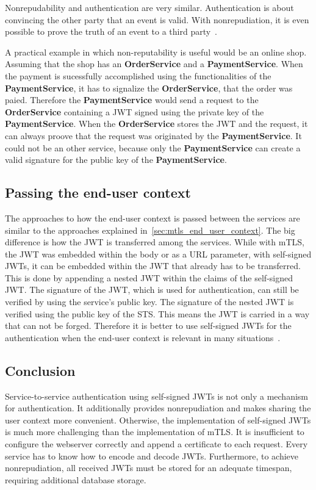 Nonrepudability and authentication are very similar.
Authentication is about convincing the other party that an event is valid.
With nonrepudiation, it is even possible to prove the truth of an event to a third party~\cite{wu20131200}.

A practical example in which non-reputability is useful would be an online shop.
Assuming that the shop has an \textbf{OrderService} and a \textbf{PaymentService}.
When the payment is sucessfully accomplished using the functionalities of the \textbf{PaymentService}, it has to signalize the \textbf{OrderService}, that the order was paied.
Therefore the \textbf{PaymentService} would send a request to the \textbf{OrderService} containing a JWT signed using the private key of the \textbf{PaymentService}.
When the \textbf{OrderService} stores the JWT and the request, it can always proove that the request was originated by the \textbf{PaymentService}.
It could not be an other service, because only the \textbf{PaymentService} can create a valid signature for the public key of the \textbf{PaymentService}.


\subsection{Passing the end-user context}
The approaches to how the end-user context is passed between the services are similar to the approaches explained in~\ref{sec:mtls_end_user_context}.
The big difference is how the JWT is transferred among the services.
While with mTLS, the JWT was embedded within the body or as a URL parameter, with self-signed JWTs, it can be embedded within the JWT that already has to be transferred.
This is done by appending a nested JWT within the claims of the self-signed JWT.
The signature of the JWT, which is used for authentication, can still be verified by using the service's public key.
The signature of the nested JWT is verified using the public key of the STS.
This means the JWT is carried in a way that can not be forged.
Therefore it is better to use self-signed JWTs for the authentication when the end-user context is relevant in many situations~\cite{dias2020microservices}.

\subsection{Conclusion}
Service-to-service authentication using self-signed JWTs is not only a mechanism for authentication. It additionally provides nonrepudiation and makes sharing the user context more convenient. 
Otherwise, the implementation of self-signed JWTs is much more challenging than the implementation of mTLS.
It is insufficient to configure the webserver correctly and append a certificate to each request.
Every service has to know how to encode and decode JWTs.
Furthermore, to achieve nonrepudiation, all received JWTs must be stored for an adequate timespan, requiring additional database storage.

